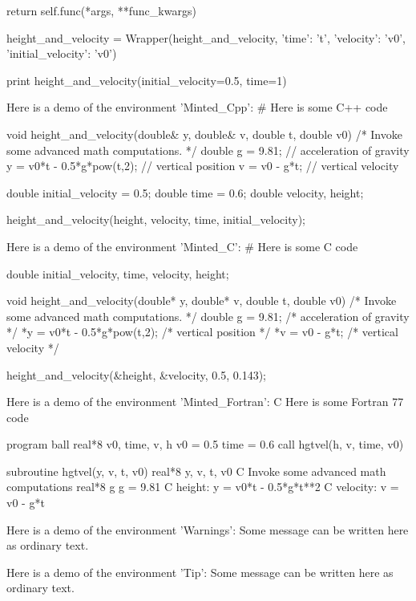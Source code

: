         return self.func(*args, **func_kwargs)

height_and_velocity = Wrapper(height_and_velocity,
                              {'time': 't',
                               'velocity': 'v0',
                               'initial_velocity': 'v0'})

print height_and_velocity(initial_velocity=0.5, time=1)


\noindent
Here is a demo of the environment 'Minted\_Cpp':
# Here is some C++ code

void height_and_velocity(double& y, double& v, 
                         double t, double v0)
{
    /*
    Invoke some advanced math computations.
    */
    double g = 9.81;               // acceleration of gravity
    y = v0*t - 0.5*g*pow(t,2);     // vertical position
    v = v0 - g*t;                  // vertical velocity
}

double initial_velocity = 0.5;
double time = 0.6;
double velocity, height;

height_and_velocity(height, velocity, time, initial_velocity);

\noindent
Here is a demo of the environment 'Minted\_C':
# Here is some C code

double initial_velocity, time, velocity, height;

void height_and_velocity(double* y, double* v, 
                         double t, double v0)
{
    /*
    Invoke some advanced math computations.
    */
    double g = 9.81;                /* acceleration of gravity */
    *y = v0*t - 0.5*g*pow(t,2);     /* vertical position */
    *v = v0 - g*t;                  /* vertical velocity */
}

height_and_velocity(&height, &velocity, 0.5, 0.143);

\noindent
Here is a demo of the environment 'Minted\_Fortran':
C Here is some Fortran 77 code

       program ball
       real*8 v0, time, v, h
       v0 = 0.5
       time = 0.6
       call hgtvel(h, v, time, v0)

       subroutine hgtvel(y, v, t, v0)
       real*8 y, v, t, v0
C      Invoke some advanced math computations
       real*8 g
       g = 9.81
C      height:
       y = v0*t - 0.5*g*t**2
C      velocity:
       v = v0 - g*t

\noindent
Here is a demo of the environment 'Warnings':
Some message can be written here as ordinary
text.


\noindent
Here is a demo of the environment 'Tip':
Some message can be written here as ordinary
text.


